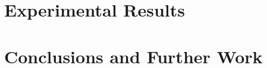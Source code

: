 \documentclass[a4paper,12pt]{book}
\begin{document}
\chapter{Experimental Results} \label{chap:exp_results}

\chapter{Conclusions and Further Work} \label{chap:conclusions}

\printbibliography %
\end{document}
